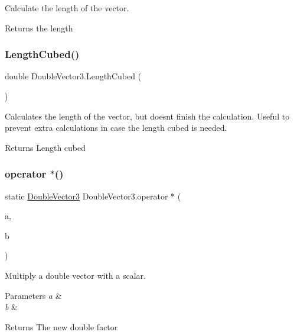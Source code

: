 Calculate the length of the vector. 

\begin{DoxyReturn}{Returns}
the length
\end{DoxyReturn}
\mbox{\label{class_double_vector3_a3856b93c953c7bd5310b8c228c1c2b1e}} 
\subsubsection{\texorpdfstring{LengthCubed()}{LengthCubed()}}
{\footnotesize\ttfamily double Double\+Vector3.\+Length\+Cubed (\begin{DoxyParamCaption}{ }\end{DoxyParamCaption})}



Calculates the length of the vector, but doesn\textquotesingle{}t finish the calculation. Useful to prevent extra calculations in case the length cubed is needed. 

\begin{DoxyReturn}{Returns}
Length cubed
\end{DoxyReturn}
\mbox{\label{class_double_vector3_adf389425fb8a1e1ec3d8ef65fb1f2846}} 
\subsubsection{\texorpdfstring{operator $\ast$()}{operator *()}\hspace{0.1cm}{\footnotesize\ttfamily [1/2]}}
{\footnotesize\ttfamily static \mbox{\hyperlink{class_double_vector3}{Double\+Vector3}} Double\+Vector3.\+operator $\ast$ (\begin{DoxyParamCaption}\item[{\mbox{\hyperlink{class_double_vector3}{Double\+Vector3}}}]{a,  }\item[{double}]{b }\end{DoxyParamCaption})\hspace{0.3cm}{\ttfamily [static]}}



Multiply a double vector with a scalar. 


\begin{DoxyParams}{Parameters}
{\em a} & \\
\hline
{\em b} & \\
\hline
\end{DoxyParams}
\begin{DoxyReturn}{Returns}
The new double factor
\end{DoxyReturn}
\mbox{\label{class_double_vector3_a7188798234df06b15e0c6946285e02b8}} 
